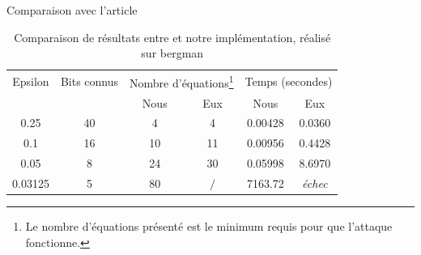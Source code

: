 \documentclass{backend/backend}
\begin{document}
\begin{frame}{Comparaison avec l'article}

\begin{center}
    \begin{table}[H]
        \centering
        \caption{Comparaison de résultats entre \cite{latAtk} et notre implémentation, réalisé sur bergman}
        \label{tab:comparaison_signatures}
        
        \begin{tabular}{|c|c|cc|cc|}
            \toprule
            Epsilon & Bits connus & \multicolumn{2}{|c|}{Nombre d'équations\footnote{Le nombre d'équations présenté est le minimum requis pour que l'attaque fonctionne.}} & \multicolumn{2}{|c|}{Temps (secondes)} \\
            \cmidrule{3-6}
            && Nous & Eux & Nous & Eux \\
            \midrule
                0.25  & 40 & 4  & 4  & 0.00428  & 0.0360 \\
                0.1   & 16 & 10 & 11 & 0.00956  & 0.4428 \\
                0.05  & 8  & 24 & 30 & 0.05998 & 8.6970 \\
                0.03125 & 5  & 80 & $/$  & 7163.72 & \textit{échec} \\
            \bottomrule
        \end{tabular}
    \end{table}
\end{center}

\end{frame}
\end{document}
